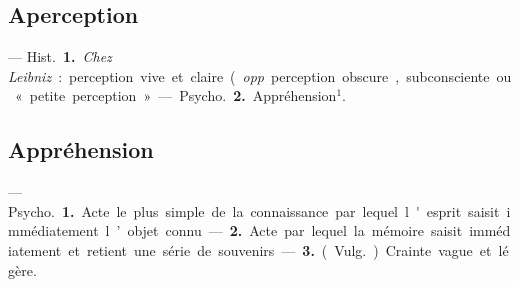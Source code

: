 \subsection{Aperception}
 — \si{Hist.} {\bf 1.} {\it Chez Leibniz} :
perception vive et claire ({\it opp}. perception obscure, subconsciente ou
« petite perception ».

 — \si{Psycho.} {\bf 2.} Appréhension$^1$.

\subsection{Appréhension}
 — \si{Psycho.} {\bf 1.} Acte le
plus simple de la connaissance par
lequel l'esprit saisit immédiatement
l’objet connu.

 — {\bf 2.} Acte par lequel
la mémoire saisit immédiatement et
retient une série de souvenirs.

 — {\bf 3.} (\si{Vulg.}) Crainte vague et légère.

